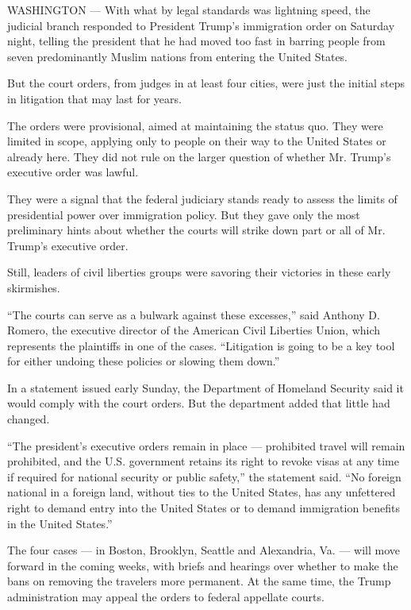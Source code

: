 WASHINGTON --- With what by legal standards was lightning speed, the
judicial branch responded to President Trump's immigration order on
Saturday night, telling the president that he had moved too fast in
barring people from seven predominantly Muslim nations from entering the
United States.

But the court orders, from judges in at least four cities, were just the
initial steps in litigation that may last for years.

The orders were provisional, aimed at maintaining the status quo. They
were limited in scope, applying only to people on their way to the
United States or already here. They did not rule on the larger question
of whether Mr. Trump's executive order was lawful.

They were a signal that the federal judiciary stands ready to assess the
limits of presidential power over immigration policy. But they gave only
the most preliminary hints about whether the courts will strike down
part or all of Mr. Trump's executive order.

Still, leaders of civil liberties groups were savoring their victories
in these early skirmishes.

``The courts can serve as a bulwark against these excesses,'' said
Anthony D. Romero, the executive director of the American Civil
Liberties Union, which represents the plaintiffs in one of the cases.
``Litigation is going to be a key tool for either undoing these policies
or slowing them down.''

In a statement issued early Sunday, the Department of Homeland Security
said it would comply with the court orders. But the department added
that little had changed.

``The president's executive orders remain in place --- prohibited travel
will remain prohibited, and the U.S. government retains its right to
revoke visas at any time if required for national security or public
safety,'' the statement said. ``No foreign national in a foreign land,
without ties to the United States, has any unfettered right to demand
entry into the United States or to demand immigration benefits in the
United States.''

The four cases --- in Boston, Brooklyn, Seattle and Alexandria, Va. ---
will move forward in the coming weeks, with briefs and hearings over
whether to make the bans on removing the travelers more permanent. At
the same time, the Trump administration may appeal the orders to federal
appellate courts.

